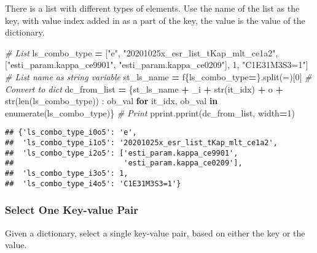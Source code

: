 \documentclass[
]{book}
\newenvironment{Shaded}{\begin{snugshade}}{\end{snugshade}}
\newcommand{\BuiltInTok}[1]{#1}
\newcommand{\CommentTok}[1]{\textcolor[rgb]{0.56,0.35,0.01}{\textit{#1}}}
\newcommand{\ControlFlowTok}[1]{\textcolor[rgb]{0.13,0.29,0.53}{\textbf{#1}}}
\newcommand{\DecValTok}[1]{\textcolor[rgb]{0.00,0.00,0.81}{#1}}
\newcommand{\KeywordTok}[1]{\textcolor[rgb]{0.13,0.29,0.53}{\textbf{#1}}}
\newcommand{\NormalTok}[1]{#1}
\newcommand{\OperatorTok}[1]{\textcolor[rgb]{0.81,0.36,0.00}{\textbf{#1}}}
\newcommand{\SpecialCharTok}[1]{\textcolor[rgb]{0.00,0.00,0.00}{#1}}
\newcommand{\SpecialStringTok}[1]{\textcolor[rgb]{0.31,0.60,0.02}{#1}}
\newcommand{\StringTok}[1]{\textcolor[rgb]{0.31,0.60,0.02}{#1}}
\begin{document}
There is a list with different types of elements. Use the name of the list as the key, with value index added in as a part of the key, the value is the value of the dictionary.

\begin{Shaded}
\begin{Highlighting}[]
\CommentTok{\# List}
\NormalTok{ls\_combo\_type }\OperatorTok{=}\NormalTok{ [}\StringTok{"e"}\NormalTok{, }\StringTok{"20201025x\_esr\_list\_tKap\_mlt\_ce1a2"}\NormalTok{, [}\StringTok{"esti\_param.kappa\_ce9901"}\NormalTok{, }\StringTok{"esti\_param.kappa\_ce0209"}\NormalTok{], }\DecValTok{1}\NormalTok{, }\StringTok{"C1E31M3S3=1"}\NormalTok{]}
\CommentTok{\# List name as string variable}
\NormalTok{st\_ls\_name }\OperatorTok{=} \SpecialStringTok{f\textquotesingle{}}\SpecialCharTok{\{}\NormalTok{ls\_combo\_type}\OperatorTok{=}\SpecialCharTok{\}}\SpecialStringTok{\textquotesingle{}}\NormalTok{.split(}\StringTok{\textquotesingle{}=\textquotesingle{}}\NormalTok{)[}\DecValTok{0}\NormalTok{]}
\CommentTok{\# Convert to dict}
\NormalTok{dc\_from\_list }\OperatorTok{=}\NormalTok{ \{st\_ls\_name }\OperatorTok{+} \StringTok{\textquotesingle{}\_i\textquotesingle{}} \OperatorTok{+} \BuiltInTok{str}\NormalTok{(it\_idx) }\OperatorTok{+} \StringTok{\textquotesingle{}o\textquotesingle{}} \OperatorTok{+} \BuiltInTok{str}\NormalTok{(}\BuiltInTok{len}\NormalTok{(ls\_combo\_type)) : ob\_val }
                \ControlFlowTok{for}\NormalTok{ it\_idx, ob\_val }\KeywordTok{in} \BuiltInTok{enumerate}\NormalTok{(ls\_combo\_type)\}}
\CommentTok{\# Print}
\NormalTok{pprint.pprint(dc\_from\_list, width}\OperatorTok{=}\DecValTok{1}\NormalTok{)}
\end{Highlighting}
\end{Shaded}

\begin{verbatim}
## {'ls_combo_type_i0o5': 'e',
##  'ls_combo_type_i1o5': '20201025x_esr_list_tKap_mlt_ce1a2',
##  'ls_combo_type_i2o5': ['esti_param.kappa_ce9901',
##                         'esti_param.kappa_ce0209'],
##  'ls_combo_type_i3o5': 1,
##  'ls_combo_type_i4o5': 'C1E31M3S3=1'}
\end{verbatim}

\hypertarget{select-one-key-value-pair}{%
\subsubsection{Select One Key-value Pair}\label{select-one-key-value-pair}}

Given a dictionary, select a single key-value pair, based on either the key or the value.
\end{document}

